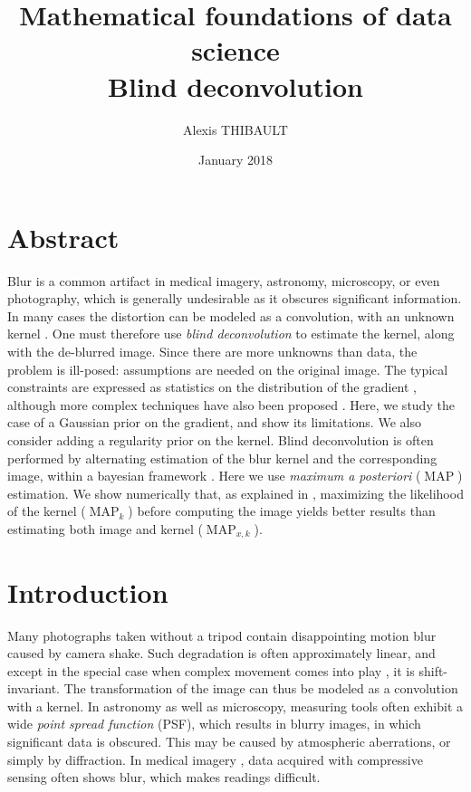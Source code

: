 \documentclass[french,a4paper]{article}
\title{Mathematical foundations of data science\\
Blind deconvolution}
\date{January 2018}
\author{Alexis THIBAULT}
\theoremstyle{plain}
\theoremstyle{definition}
\theoremstyle{remark}
\DeclareMathOperator{\MAP}{MAP}
\begin{document}
\maketitle

\section{Abstract}
Blur is a common artifact in medical imagery, astronomy, microscopy, or even photography, which is generally undesirable as it obscures significant information.
In many cases the distortion can be modeled as a convolution, with an unknown kernel \cite{fergus2006removing,cho2009fast,cho2010motion,jia2007single,xu2010two}. One must therefore use \emph{blind deconvolution} to estimate the kernel, along with the de-blurred image.
Since there are more unknowns than data, the problem is ill-posed: assumptions are needed on the original image. The typical constraints are expressed as statistics on the distribution of the gradient \cite{joshi2008psf,krishnan2009fast,levi2009using,levin2007blind}, although more complex techniques have also been proposed \cite{miskin2000ensemble,jalobeanu2002satellite}. Here, we study the case of a Gaussian prior on the gradient, and show its limitations. We also consider adding a regularity prior on the kernel.
Blind deconvolution is often performed by alternating estimation of the blur kernel and the corresponding image, within a bayesian framework \cite{richardson1972bayesian,levin2007blind,levin2009understanding,levin2011efficient,krishnan2009fast,joshi2008psf,jia2007single,levi2009using}.
Here we use \emph{maximum a posteriori} ($\MAP$) estimation. We show numerically that, as explained in \cite{levin2011efficient}, maximizing the likelihood of the kernel ($\MAP_k$) before computing the image yields better results than estimating both image and kernel ($\MAP_{x,k}$).




\section{Introduction}
Many photographs taken without a tripod contain disappointing motion blur caused by camera shake. Such degradation is often approximately linear, and except in the special case when complex movement comes into play \cite{shan2007rotational,whyte2012non}, it is shift-invariant. The transformation of the image can thus be modeled as a convolution with a kernel.
In astronomy as well as microscopy, measuring tools often exhibit a wide \emph{point spread function} (PSF), which results in blurry images, in which significant data is obscured. This may be caused by atmospheric aberrations, or simply by diffraction.
In medical imagery \cite{chen2016compressive}, data acquired with compressive sensing often shows blur, which makes readings difficult.
\end{document}
